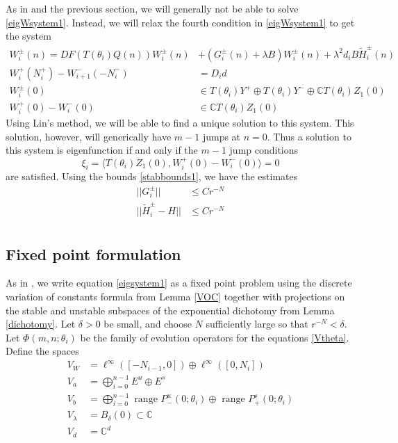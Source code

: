 \documentclass[12pt]{article}
\def\C{{\mathbb C}}
\begin{document}
As in \cite{Sandstede1998} and the previous section, we will generally not be able to solve \eqref{eigWsystem1}. Instead, we will relax the fourth condition in \eqref{eigWsystem1} to get the system
\begin{align}
W_i^\pm(n) = DF(T(\theta_i) Q(n) ) W_i^\pm(n) &+ (G_i^\pm(n) + \lambda B) W_i^\pm(n) + \lambda^2 d_i B \tilde{H}_i^\pm(n) \label{eigsystem1} \\
W_i^+(N_i^+) - W_{i+1}^-(-N_i^-) &= D_i d \label{eigsystem2} \\
W_i^\pm(0) &\in T(\theta_i) Y^+ \oplus T(\theta_i) Y^- \oplus \C T(\theta_i) Z_1(0) \label{eigsystem3a} \\
W_i^+(0) - W_i^-(0) &\in \C T(\theta_i) Z_1(0) \label{eigsystem3b} 
\end{align}
Using Lin's method, we will be able to find a unique solution to this system. This solution, however, will generically have $m-1$ jumps at $n = 0$. Thus a solution to this system is eigenfunction if and only if the $m-1$ jump conditions
\begin{equation*}
\xi_i = \langle T(\theta_i) Z_1(0), W_i^+(0) - W_i^-(0) \rangle = 0
\end{equation*}
are satisfied. Using the bounds \eqref{stabbounds1}, we have the estimates
\begin{equation}\label{stabbounds2}
\begin{aligned}
||G_i^\pm|| &\leq C r^{-N} \\
||\tilde{H}_i^\pm - H|| &\leq C r^{-N} \\
\end{aligned}
\end{equation}

\subsection{Fixed point formulation}

As in \cite{Sandstede1998}, we write equation \eqref{eigsystem1} as a fixed point problem using the discrete variation of constants formula from Lemma \ref{VOC} together with projections on the stable and unstable subspaces of the exponential dichotomy from Lemma \ref{dichotomy}. Let $\delta > 0$ be small, and choose $N$ sufficiently large so that $r^{-N} < \delta$. Let $\Phi(m, n; \theta_i)$ be the family of evolution operators for the equations \eqref{Vtheta}. Define the spaces
\begin{align*}
V_W &= \ell^\infty([-N_{i-1}, 0]) \oplus \ell^\infty([0, N_i])  \\
V_a &= \bigoplus_{i=0}^{n-1} E^u \oplus E^s \\
V_b &= \bigoplus_{i=0}^{n-1} 
\text{ range } P_-^u(0; \theta_i) \oplus \text{ range } P_+^s(0; \theta_i)\\
V_\lambda &= B_\delta(0) \subset \C \\
V_d &= \C^d
\end{align*}
\end{document}
